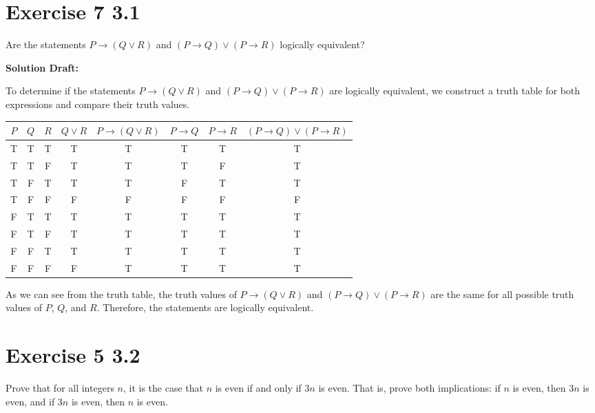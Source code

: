 \documentclass{article}
\begin{document}
\section*{Exercise 7 3.1}  

Are the statements $P \rightarrow (Q\vee R)$ and \((P \rightarrow Q) \lor (P \rightarrow R)\) logically equivalent?

\vspace{0.5cm}
\noindent\textbf{Solution Draft:} 
\vspace{0.2cm}


To determine if the statements \( P \rightarrow (Q \lor R) \) and \( (P \rightarrow Q) \lor (P \rightarrow R) \) are logically equivalent, we construct a truth table for both expressions and compare their truth values.

\begin{tabular}{ccc|c|c|c|c|c}
\(P\) & \(Q\) & \(R\) & \(Q \lor R\) & \(P \rightarrow (Q \lor R)\) & \(P \rightarrow Q\) & \(P \rightarrow R\) & \((P \rightarrow Q) \lor (P \rightarrow R)\) \\
\hline
T & T & T & T & T & T & T & T \\
T & T & F & T & T & T & F & T \\
T & F & T & T & T & F & T & T \\
T & F & F & F & F & F & F & F \\
F & T & T & T & T & T & T & T \\
F & T & F & T & T & T & T & T \\
F & F & T & T & T & T & T & T \\
F & F & F & F & T & T & T & T \\
\end{tabular}

As we can see from the truth table, the truth values of \( P \rightarrow (Q \lor R) \) and \( (P \rightarrow Q) \lor (P \rightarrow R) \) are the same for all possible truth values of \( P \), \( Q \), and \( R \). Therefore, the statements are logically equivalent.



\section*{Exercise 5 3.2}  

Prove that for all integers \(n\), it is the case that \(n\) is  even if and only if \(3n\) is even.  That is, prove both implications: if \(n\) is even, then \(3n\) is even, and if \(3n\) is even, then \(n\) is even.
\end{document}
